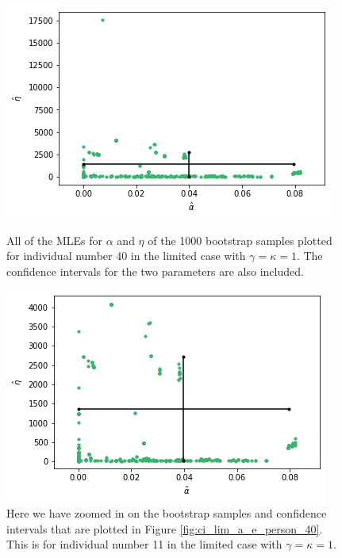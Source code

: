 \begin{figure}
    \centering
    \begin{minipage}{0.48\textwidth}
        \centering
        \includegraphics[scale=0.37]{pictures/ci_lim_a_e_person40.png}
        \caption[MLEs for $\alpha$ and $\eta$ for bootstrap samples individual 40, limited]{All of the MLEs for $\alpha$ and $\eta$ of the 1000 bootstrap samples plotted for individual number 40 in the limited case with $\gamma=\kappa=1$. The confidence intervals for the two parameters are also included.}
        \label{fig:ci_lim_a_e_person_40}
    \end{minipage}\hfill
    \begin{minipage}{0.48\textwidth}
        \centering
        \includegraphics[scale=0.37]{pictures/ci_lim_a_e_person40_zoomed.png}
        \caption[MLEs for $\alpha$ and $\eta$ of bootstrap samples individual 40, limited, zoomed]{Here we have zoomed in on the bootstrap samples and confidence intervals that are plotted in Figure \ref{fig:ci_lim_a_e_person_40}. This is for individual number 11 in the limited case with $\gamma=\kappa=1$.}
        \label{fig:ci_lim_a_e_person_40_zoomed}
    \end{minipage}
\end{figure}

